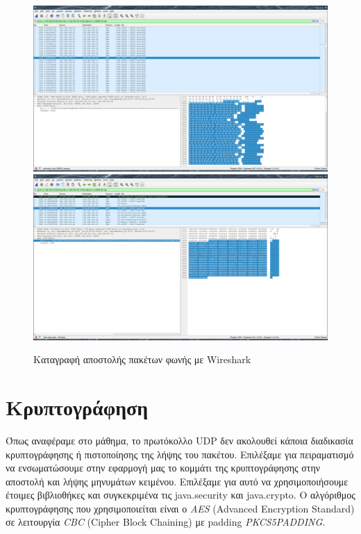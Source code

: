 \documentclass{article}
\begin{document}
\begin{figure}%
    \centering
    {\includegraphics[scale=0.1]{voice-stream.png}}
    {\includegraphics[scale=0.1]{voice-small-packets2.png}}
    \caption{Καταγραφή αποστολής πακέτων φωνής με Wireshark}
\end{figure}

\section{Κρυπτογράφηση}
Όπως αναφέραμε στο μάθημα, το πρωτόκολλο UDP δεν ακολουθεί κάποια διαδικασία κρυπτογράφησης ή πιστοποίησης της λήψης του πακέτου.
Επιλέξαμε για πειραματισμό να ενσωματώσουμε στην εφαρμογή μας το κομμάτι της κρυπτογράφησης στην αποστολή και λήψης μηνυμάτων κειμένου.
Επιλέξαμε για αυτό να χρησιμοποιήσουμε έτοιμες βιβλιοθήκες και συγκεκριμένα τις java.security και java.crypto. 
Ο αλγόριθμος κρυπτογράφησης που χρησιμοποιείται είναι ο \textit{AES} (Advanced Encryption Standard) σε λειτουργία \textit{CBC}
(Cipher Block Chaining) με padding \textit{PKCS5PADDING}.
\end{document}
